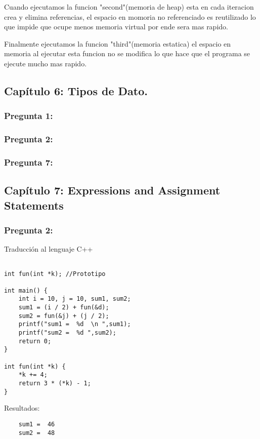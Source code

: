 \documentclass[11pt]{article}
\begin{document}
Cuando ejecutamos la funcion "second"(memoria de heap) esta en cada iteracion crea y elimina referencias, el espacio en momoria no referenciado es reutilizado lo que impide que ocupe menos memoria virtual por ende sera mas rapido.

Finalmente ejecutamos la funcion "third"(memoria estatica) el espacio en memoria al ejecutar esta funcion no se modifica lo que hace que el programa se ejecute mucho mas rapido.


\subsection{Capítulo 6: Tipos de Dato.}
\subsubsection{Pregunta 1:}

\subsubsection{Pregunta 2:}

\subsubsection{Pregunta 7:}

\subsection{Capítulo 7: Expressions and Assignment Statements}

\subsubsection{Pregunta 2:}
Traducción al lenguaje C++

\begin{lstlisting}[frame = single]

int fun(int *k); //Prototipo

int main() {
    int i = 10, j = 10, sum1, sum2;
    sum1 = (i / 2) + fun(&d);
    sum2 = fun(&j) + (j / 2);
    printf("sum1 =  %d  \n ",sum1);
    printf("sum2 =  %d ",sum2);
    return 0;
}

int fun(int *k) {
    *k += 4;
    return 3 * (*k) - 1;
}
\end{lstlisting}

\noindent Resultados:
\begin{verbatim}
	sum1 =  46
	sum2 =  48
\end{verbatim}
\end{document}
